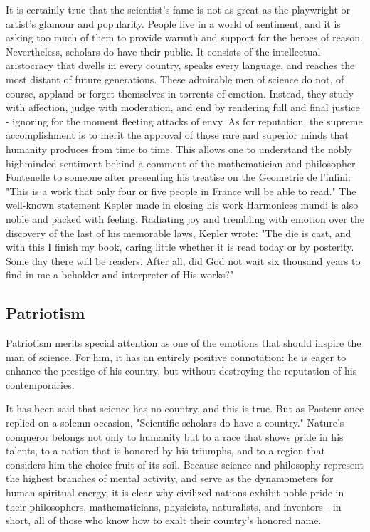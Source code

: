 \documentclass{article}
\begin{document}
It is certainly true that the scientist’s fame is not as great as the playwright or artist’s glamour and popularity. People live in a world of sentiment, and it is asking too much of them to provide warmth and support for the heroes of reason. Nevertheless, scholars do have their public. It consists of the intellectual aristocracy that dwells in every country, speaks every language, and reaches the most distant of future generations. These admirable men of science do not, of course, applaud or forget themselves in torrents of emotion. Instead, they study with affection, judge with moderation, and end by rendering full and final justice - ignoring for the moment fleeting attacks of envy. As for reputation, the supreme accomplishment is to merit the approval of those rare and superior minds that humanity produces from time to time. This allows one to understand the nobly highminded sentiment behind a comment of the mathematician and philosopher Fontenelle to someone after presenting his treatise on the Geometrie de l’infini: "This is a work that only four or five people in France will be able to read." The well-known statement Kepler made in closing his work Harmonices mundi is also noble and packed with feeling. Radiating joy and trembling with emotion over the discovery of the last of his memorable laws, Kepler wrote: "The die is cast, and with this I finish my book, caring little whether it is read today or by posterity. Some day there will be readers. After all, did God not wait six thousand years to find in me a beholder and interpreter of His works?"

\subsection*{Patriotism}

Patriotism merits special attention as one of the emotions that should inspire the man of science. For him, it has an entirely positive connotation: he is eager to enhance the prestige of his country, but without destroying the reputation of his contemporaries.

It has been said that science has no country, and this is true. But as Pasteur once replied on a solemn occasion, "Scientific scholars do have a country." Nature’s conqueror belongs not only to humanity but to a race that shows pride in his talents, to a nation that is honored by his triumphs, and to a region that considers him the choice fruit of its soil. Because science and philosophy represent the highest branches of mental activity, and serve as the dynamometers for human spiritual energy, it is clear why civilized nations exhibit noble pride in their philosophers, mathematicians, physicists, naturalists, and inventors - in short, all of those who know how to exalt their country’s honored name.
\end{document}
